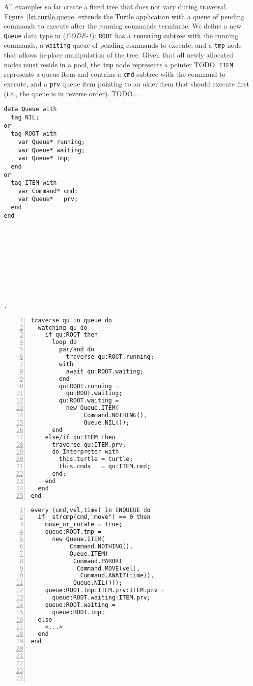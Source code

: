 \documentclass{acm_proc_article-sp}
\newcommand{\code}[1] {{\small{\texttt{#1}}}}
\begin{document}
All examples so far create a fixed tree that does not vary during traversal.
%
Figure~\ref{lst.turtle.queue} extends the Turtle application with a queue of 
pending commands to execute after the running commands terminate.
We define a new \code{Queue} data type in (\emph{CODE-1}):
\code{ROOT} has a \code{runnning} subtree with the running commands, a 
\code{waiting} queue of pending commands to execute, and a \code{tmp} node that 
allows in-place manipulation of the tree.
Given that all newly allocated nodes must reside in a pool, the \code{tmp} node 
represents a pointer TODO.
\code{ITEM} represents a queue item and contains a \code{cmd} subtree with the 
command to execute, and a \code{prv} queue item pointing to an older item that 
should execute first (i.e., the queue is in reverse order).
%
TODO...

\begin{figure*}%
\begin{minipage}[t]{0.20\linewidth}
\begin{lstlisting}[title=CODE-1: The \code{Queue} data type]
data Queue with
  tag NIL;
or
  tag ROOT with
    var Queue* running;
    var Queue* waiting;
    var Queue* tmp;
  end
or
  tag ITEM with
    var Command* cmd;
    var Queue*   prv;
  end
end










.
\end{lstlisting}
\end{minipage}
%
\begin{minipage}[t]{0.36\linewidth}
\begin{lstlisting}[numbers=left,xleftmargin=3.5em,title=CODE-2: Queue traversal]
traverse qu in queue do
  watching qu do
    if qu:ROOT then
      loop do
        par/and do
          traverse qu:ROOT.running;
        with
          await qu:ROOT.waiting;
        end
        qu:ROOT.running =
          qu:ROOT.waiting;
        qu:ROOT.waiting =
          new Queue.ITEM(
               Command.NOTHING(),
               Queue.NIL());
      end
    else/if qu:ITEM then
      traverse qu:ITEM.prv;
      do Interpreter with
        this.turtle = turtle;
        this.cmds   = qu:ITEM.cmd;
      end;
    end
  end
end
\end{lstlisting}
\end{minipage}
%
\begin{minipage}[t]{0.38\linewidth}
\begin{lstlisting}[numbers=left,xleftmargin=3.5em,title=CODE-3: Command enqueuing]
every (cmd,vel,time) in ENQUEUE do
  if _strcmp(cmd,"move") == 0 then
    move_or_rotate = true;
    queue:ROOT.tmp =
      new Queue.ITEM(
           Command.NOTHING(),
           Queue.ITEM(
            Command.PAROR(
             Command.MOVE(vel),
              Command.AWAIT(time)),
            Queue.NIL()));
    queue:ROOT.tmp:ITEM.prv:ITEM.prv =
      queue:ROOT.waiting:ITEM.prv;
    queue:ROOT.waiting =
      queue:ROOT.tmp;
  else
    <...>
  end
end






\end{lstlisting}
\end{minipage}
\end{figure*}
\end{document}

